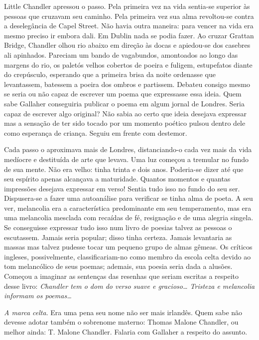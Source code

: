 Little Chandler apressou o passo. Pela primeira vez na vida sentia-se
superior às pessoas que cruzavam seu caminho. Pela primeira vez sua
alma revoltou-se contra a deselegância de Capel Street. Não havia
outra maneira: para vencer na vida era mesmo preciso ir embora dali.
Em Dublin nada se podia fazer. Ao cruzar Grattan Bridge, Chandler
olhou rio abaixo em direção às docas e apiedou-se dos casebres ali
apinhados. Pareciam um bando de vagabundos, amontoados ao longo das
margens do rio, os paletós velhos cobertos de poeira e fuligem,
estupefatos diante do crepúsculo, esperando que a primeira brisa da
noite ordenasse que levantassem, batessem a poeira dos ombros e
partissem. Debateu consigo mesmo se seria ou não capaz de escrever um
poema que expressasse essa ideia. Quem sabe Gallaher conseguiria
publicar o poema em algum jornal de Londres. Seria capaz de escrever
algo original? Não sabia ao certo que ideia desejava expressar mas a
sensação de ter sido tocado por um momento poético pulsou dentro dele
como esperança de criança. Seguiu em frente com destemor.

Cada passo o aproximava mais de Londres, distanciando-o cada vez mais
da vida medíocre e destituída de arte que levava. Uma luz começou a
tremular no fundo de sua mente. Não era velho: tinha trinta e dois
anos. Poderia-se dizer até que seu espírito apenas alcançava a
maturidade. Quantos momentos e quantas impressões desejava expressar
em verso! Sentia tudo isso no fundo do seu ser. Dispusera-se a fazer
uma autoanálise para verificar se tinha alma de poeta. A seu ver,
melancolia era a característica predominante em seu temperamento, mas
era uma melancolia mesclada com recaídas de fé, resignação e de uma
alegria singela. Se conseguisse expressar tudo isso num livro de
poesias talvez as pessoas o escutassem. Jamais seria popular; disso
tinha certeza. Jamais levantaria as massas mas talvez pudesse tocar um
pequeno grupo de almas gêmeas. Os críticos ingleses, possivelmente,
classificariam-no como membro da escola celta devido ao tom
melancólico de seus poemas; ademais, sua poesia seria dada a alusões.
Começou a imaginar as sentenças das resenhas que seriam escritas a
respeito desse livro: \textit{Chandler tem o dom do verso suave e gracioso\ldots{}
Tristeza e melancolia informam os poemas\ldots{}}

\textit{A marca celta}. Era uma pena seu nome não ser mais irlandês. Quem
sabe não devesse adotar também o sobrenome materno: Thomas
Malone Chandler, ou melhor ainda: T. Malone Chandler. Falaria com
Gallaher a respeito do assunto.

